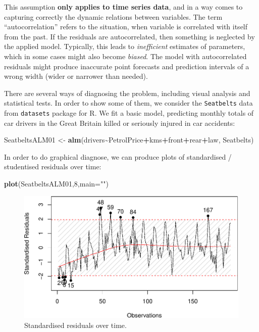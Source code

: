 \documentclass[
]{book}
\newenvironment{Shaded}{\begin{snugshade}}{\end{snugshade}}
\newcommand{\DataTypeTok}[1]{\textcolor[rgb]{0.13,0.29,0.53}{#1}}
\newcommand{\DecValTok}[1]{\textcolor[rgb]{0.00,0.00,0.81}{#1}}
\newcommand{\KeywordTok}[1]{\textcolor[rgb]{0.13,0.29,0.53}{\textbf{#1}}}
\newcommand{\NormalTok}[1]{#1}
\newcommand{\OperatorTok}[1]{\textcolor[rgb]{0.81,0.36,0.00}{\textbf{#1}}}
\newcommand{\StringTok}[1]{\textcolor[rgb]{0.31,0.60,0.02}{#1}}
\theoremstyle{definition}
\theoremstyle{definition}
\theoremstyle{definition}
\theoremstyle{definition}
\theoremstyle{remark}
\begin{document}
This assumption \textbf{only applies to time series data}, and in a way comes to capturing correctly the dynamic relations between variables. The term ``autocorrelation'' refers to the situation, when variable is correlated with itself from the past. If the residuals are autocorrelated, then something is neglected by the applied model. Typically, this leads to \emph{inefficient} estimates of parameters, which in some cases might also become \emph{biased}. The model with autocorrelated residuals might produce inaccurate point forecasts and prediction intervals of a wrong width (wider or narrower than needed).

There are several ways of diagnosing the problem, including visual analysis and statistical tests. In order to show some of them, we consider the \texttt{Seatbelts} data from \texttt{datasets} package for R. We fit a basic model, predicting monthly totals of car drivers in the Great Britain killed or seriously injured in car accidents:

\begin{Shaded}
\begin{Highlighting}[]
\NormalTok{SeatbeltsALM01 \textless{}{-}}\StringTok{ }\KeywordTok{alm}\NormalTok{(drivers}\OperatorTok{\textasciitilde{}}\NormalTok{PetrolPrice}\OperatorTok{+}\NormalTok{kms}\OperatorTok{+}\NormalTok{front}\OperatorTok{+}\NormalTok{rear}\OperatorTok{+}\NormalTok{law, Seatbelts)}
\end{Highlighting}
\end{Shaded}

In order to do graphical diagnose, we can produce plots of standardised / studentised residuals over time:

\begin{Shaded}
\begin{Highlighting}[]
\KeywordTok{plot}\NormalTok{(SeatbeltsALM01,}\DecValTok{8}\NormalTok{,}\DataTypeTok{main=}\StringTok{""}\NormalTok{)}
\end{Highlighting}
\end{Shaded}

\begin{figure}
\centering
\includegraphics{Svetunkov---Statistics-for-Business-Analytics_files/figure-latex/diagnostics08-1.pdf}
\caption{\label{fig:diagnostics08}Standardised residuals over time.}
\end{figure}
\end{document}

